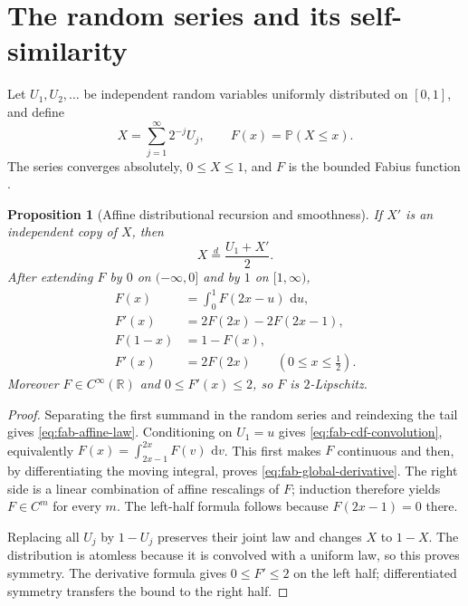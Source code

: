 \documentclass[11pt,oneside,openany]{book}
\newtheorem{proposition}[theorem]{Proposition}
\theoremstyle{definition}
\theoremstyle{remark}
\newcommand{\R}{\mathbb R}
\newcommand{\dd}{\,\mathrm d}
\newcommand{\Prob}{\mathbb P}
\begin{document}
\section{The random series and its self-similarity}

Let $U_1,U_2,\ldots$ be independent random variables uniformly distributed on
$[0,1]$, and define
\begin{equation}
 X=\sum_{j=1}^{\infty}2^{-j}U_j,
 \qquad
 F(x)=\Prob(X\le x).
 \label{eq:fab-X-F}
\end{equation}
The series converges absolutely, $0\le X\le1$, and $F$ is the bounded Fabius
function \cite{Fabius1966,AriasDefinition2017}.

\begin{proposition}[Affine distributional recursion and smoothness]
\label{prop:fab-affine-recursion}
If $X'$ is an independent copy of $X$, then
\begin{equation}
 X\overset d=\frac{U_1+X'}2.
 \label{eq:fab-affine-law}
\end{equation}
After extending $F$ by $0$ on $(-\infty,0]$ and by $1$ on $[1,\infty)$,
\begin{align}
 F(x)&=\int_0^1F(2x-u)\,\dd u,
 \label{eq:fab-cdf-convolution}\\
 F'(x)&=2F(2x)-2F(2x-1),
 \label{eq:fab-global-derivative}\\
 F(1-x)&=1-F(x),
 \label{eq:fab-symmetry}\\
 F'(x)&=2F(2x)\qquad(0\le x\le\tfrac12).
 \label{eq:fab-differential}
\end{align}
Moreover $F\in C^\infty(\R)$ and $0\le F'(x)\le2$, so $F$ is
$2$-Lipschitz.
\end{proposition}

\begin{proof}
Separating the first summand in the random series and reindexing the tail gives
\eqref{eq:fab-affine-law}.  Conditioning on $U_1=u$ gives
\eqref{eq:fab-cdf-convolution}, equivalently
$F(x)=\int_{2x-1}^{2x}F(v)\,\dd v$.  This first makes $F$ continuous and then,
by differentiating the moving integral, proves
\eqref{eq:fab-global-derivative}.  The right side is a linear combination of
affine rescalings of $F$; induction therefore yields $F\in C^m$ for every
$m$.  The left-half formula follows because $F(2x-1)=0$ there.

Replacing all $U_j$ by $1-U_j$ preserves their joint law and changes $X$ to
$1-X$.  The distribution is atomless because it is convolved with a uniform
law, so this proves symmetry.  The derivative formula gives $0\le F'\le2$ on
the left half; differentiated symmetry transfers the bound to the right half.
\end{proof}
\end{document}
